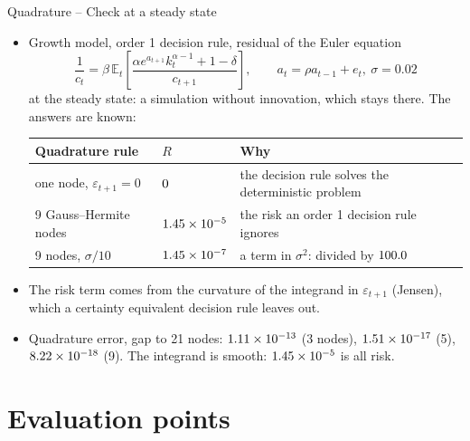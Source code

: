 \documentclass[11pt,aspectratio=169]{beamer}
\newcommand{\E}{\mathbb{E}}
\begin{document}
\begin{frame}{Quadrature -- Check at a steady state}

\begin{itemize}

\item Growth model, order 1 decision rule, residual of the Euler equation
  \[
  \frac{1}{c_t} = \beta\,\E_t\left[\frac{\alpha e^{a_{t+1}}k_t^{\alpha-1}+1-\delta}{c_{t+1}}\right],\qquad a_t = \rho a_{t-1} + e_t,\ \sigma = 0.02
  \]
  at the steady state: a simulation without innovation, which stays there. The answers are known:
  \begin{center}
  \footnotesize
  \renewcommand{\arraystretch}{1.2}
  \begin{tabular}{lll}
      \toprule
      Quadrature rule & $R$ & Why \\
      \midrule
      one node, $\varepsilon_{t+1}=0$ & $0$ & the decision rule solves the deterministic problem \\
      9 Gauss--Hermite nodes & $1.45\times10^{-5}$ & the risk an order 1 decision rule ignores \\
      9 nodes, $\sigma/10$ & $1.45\times10^{-7}$ & a term in $\sigma^2$: divided by $100.0$ \\
      \bottomrule
  \end{tabular}
  \end{center}

\item The risk term comes from the curvature of the integrand in $\varepsilon_{t+1}$ (Jensen), which a certainty equivalent decision rule leaves out.\newline

\item Quadrature error, gap to 21 nodes: $1.11\times10^{-13}$ (3 nodes), $1.51\times10^{-17}$ (5), $8.22\times10^{-18}$ (9). The integrand is smooth: $1.45\times10^{-5}$ is all risk.

\end{itemize}

\end{frame}

\section{Evaluation points}
\end{document}
